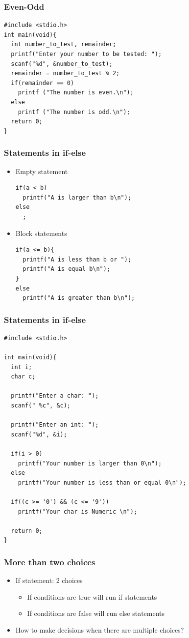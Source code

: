 \documentclass{../c-lecture}
\begin{document}
\begin{frame}[fragile]
  \frametitle{Even-Odd}
  \begin{verbatim}
#include <stdio.h>
int main(void){
  int number_to_test, remainder;
  printf("Enter your number to be tested: ");
  scanf("%d", &number_to_test);
  remainder = number_to_test % 2;
  if(remainder == 0)
    printf ("The number is even.\n");
  else
    printf ("The number is odd.\n");
  return 0;
}
  \end{verbatim}
\end{frame}

\begin{frame}[fragile]
  \frametitle{Statements in if-else}
  \begin{itemize}
    \item Empty statement
    \begin{verbatim}
if(a < b)
  printf("A is larger than b\n");
else
  ;
    \end{verbatim}
    \item Block statements
    \begin{verbatim}
if(a <= b){
  printf("A is less than b or ");
  printf("A is equal b\n");
}
else
  printf("A is greater than b\n");
    \end{verbatim}
  \end{itemize}
\end{frame}

\begin{frame}[fragile]
  \frametitle{Statements in if-else}
  \scriptsize
  \begin{verbatim}
#include <stdio.h>

int main(void){
  int i;
  char c;

  printf("Enter a char: ");
  scanf(" %c", &c);

  printf("Enter an int: ");
  scanf("%d", &i);

  if(i > 0)
    printf("Your number is larger than 0\n");
  else
    printf("Your number is less than or equal 0\n");

  if((c >= '0') && (c <= '9'))
    printf("Your char is Numeric \n");

  return 0;
}
  \end{verbatim}
\end{frame}

\begin{frame}
  \frametitle{More than two choices}
  \begin{itemize}
    \item If statement: 2 choices
    \begin{itemize}
      \item If conditions are true will run if statements
      \item If conditions are false will run else statements
    \end{itemize}
    \item How to make decisions when there are multiple choices?
  \end{itemize}
\end{frame}
\end{document}

